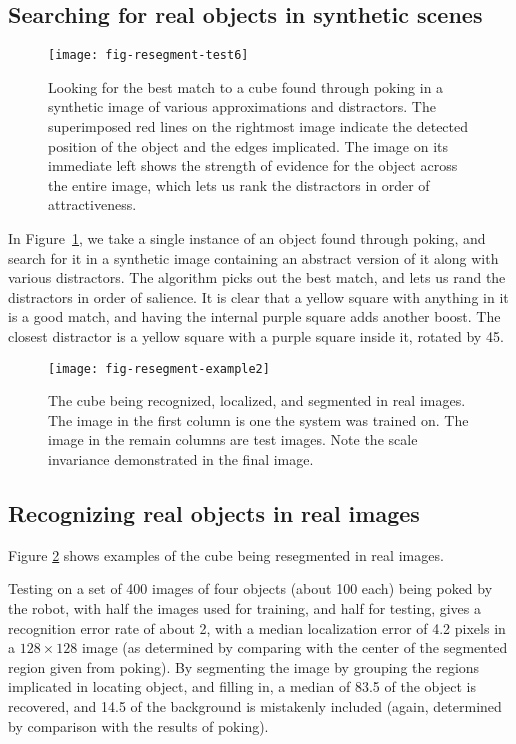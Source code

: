 \subsection{Searching for real objects in synthetic scenes}

\begin{figure}[tb]
\centerline{\texttt{[image: fig-resegment-test6]}}
\caption[Searching for real objects in synthetic scenes]{ 
%
%
Looking for the best match to a cube found through poking in a
synthetic image of various approximations and distractors.
The superimposed red lines on the rightmost image
indicate the detected position of the object and the
edges implicated. 
The image on its immediate left shows the strength of
evidence for the object across the entire image, which lets us rank
the distractors in order of attractiveness. 
%
}
\label{fig:resegment-cube-yellow}
\end{figure}


In Figure~\ref{fig:resegment-cube-yellow}, we take a 
single instance of an object found through poking,
and search for it in a synthetic image containing an
abstract version of it along with various distractors.
The algorithm picks out the best match, and lets us
rand the distractors in order of salience.  It is clear that a yellow
square with anything in it is a good match, and having the internal
purple square adds another boost.  The closest distractor is a yellow 
square with a purple square inside it, rotated by 45\dgrs{}.




\begin{figure}[tb]
\centerline{\texttt{[image: fig-resegment-example2]}}
\caption[Another example]{ 
%
The cube being recognized, localized, and segmented in real images.
The image in the first column is one the system was trained on.
The image in the remain columns are test images.
Note the scale invariance demonstrated in the final image.
%
}
\label{fig:resegment-cube-real}
\end{figure}



\subsection{Recognizing real objects in real images}

Figure \ref{fig:resegment-cube-real}
shows examples of the cube being resegmented in real images.
%
%

Testing on a set of 400 images of four objects (about 100 each) being
poked by the robot, with half the images used for training, and half
for testing, gives a recognition error rate of about 2{\percent}, with
a median localization error of 4.2 pixels in a $128\times 128$ image
(as determined by comparing with the center of the segmented region
given from poking).  
%
By segmenting the image by grouping the regions
implicated in locating object, and filling in, a median of
83.5{\percent} of the object is recovered, and 14.5{\percent} of the
background is mistakenly included (again, determined by comparison
with the results of poking).
%





